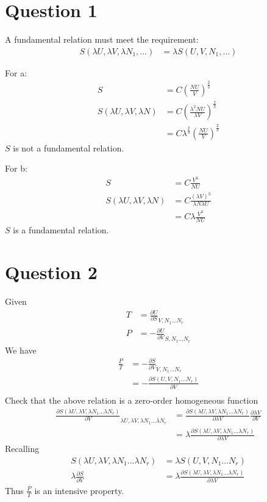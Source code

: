\documentclass{article}
\numberwithin{equation}{section}
\begin{document}
\large
\section*{Question 1}

A fundamental relation must meet the requirement:
\begin{align*}
S(\lambda U, \lambda V, \lambda N_1,...)&=  \lambda S(U, V, N_1,...)
\end{align*}

For a:
\begin{align*}
S&=C\left (\frac{NU}{V}\right )^{\frac{2}{3}}\\
S(\lambda U, \lambda V, \lambda N)&= C \left( \frac{\lambda^2 NU}{\lambda V} \right )^{\frac{2}{3}}\\
&=C \lambda ^{\frac{2}{3}}\left (\frac{NU}{V}\right )^{\frac{2}{3}}
\end{align*}
$S$ is not a fundamental relation.

For b:
\begin{align*}
S&=C\frac{V^3}{NU}\\
S(\lambda U, \lambda V, \lambda N)&= C\frac{(\lambda V)^3}{\lambda N \lambda U}\\
&=C \lambda \frac{V^3}{NU}
\end{align*}
$S$ is a fundamental relation.

\section*{Question 2}

Given
\begin{align*}
T &= \frac{\partial U}{\partial S}_{V,N_1...N_r}\\
P &= - \frac{\partial U}{\partial V}_{S,N_1...N_r}
\end{align*}
We have
\begin{align*}
\frac{P}{T}&= -\frac{\partial S}{\partial V}_{V,N_1...N_r}\\
&=-\frac{\partial S (U,V,N_1...N_r)}{\partial V}\\ 
\end{align*}
Check that the above relation is a zero-order homogeneous function
\begin{align*}
\frac{\partial S (\lambda U, \lambda V,\lambda N_1... \lambda N_r)}{\partial V}_{\lambda U, \lambda V,\lambda N_1... \lambda N_r}&= \frac{\partial S (\lambda U, \lambda V,\lambda N_1... \lambda N_r)}{\partial \lambda V}\frac{\partial \lambda V}{\partial V}\\
&=\lambda \frac{\partial S (\lambda U, \lambda V,\lambda N_1... \lambda N_r)}{\partial \lambda V}
\end{align*}
Recalling
\begin{align*}
 S (\lambda U, \lambda V,\lambda N_1... \lambda N_r)&= \lambda S (U,V,N_1...N_r)\\
\lambda \frac{\partial S}{\partial V}&=\lambda \frac{\partial S (\lambda U, \lambda V,\lambda N_1... \lambda N_r)}{\partial \lambda V}
\end{align*}
Thus $ \frac{P}{T} $ is an intensive property.
\end{document}
